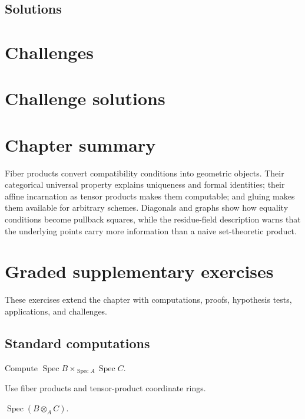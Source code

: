 \ifdefined\IncludeExerciseSolutions
\subsection*{Solutions}

\fi

\section{Challenges}






\ifdefined\IncludeChallengeSolutions
\section{Challenge solutions}

\fi

\section{Chapter summary}
Fiber products convert compatibility conditions into geometric objects.  Their categorical universal
property explains uniqueness and formal identities; their affine incarnation as tensor products makes
them computable; and gluing makes them available for arbitrary schemes.  Diagonals and graphs show
how equality conditions become pullback squares, while the residue-field description warns that the
underlying points carry more information than a naive set-theoretic product.


\section{Graded supplementary exercises}
These exercises extend the chapter with computations, proofs, hypothesis tests, applications, and challenges.

\subsection*{Standard computations}

\begin{exercise}\label{exr:vi23-expand-01}
Compute $\operatorname{Spec}B\times_{\operatorname{Spec}A}\operatorname{Spec}C$.
\end{exercise}
\begin{hint}
Use fiber products and tensor-product coordinate rings.
\end{hint}
\begin{solution}
$\operatorname{Spec}(B\otimes_A C)$.
\end{solution}

